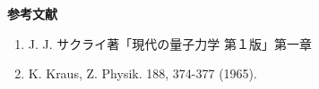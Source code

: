 \documentclass[11pt,pra,aps]{revtex4}
\begin{document}
\noindent
{\bf 参考文献}
\begin{enumerate}
\item J. J. サクライ著「現代の量子力学 第１版」第一章
\item K. Kraus, Z. Physik. 188, 374-377 (1965).
\end{enumerate}

%
%
%    
%

%    
%
%
%
    
\end{document}
